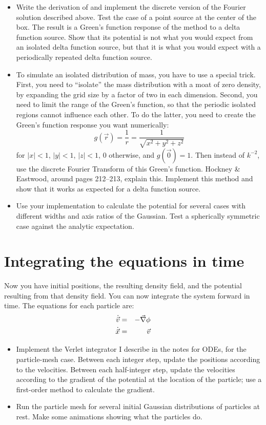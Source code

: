 \documentclass[11pt, preprint]{aastex}
\begin{document}
\begin{itemize}
\item Write the derivation of and implement the discrete version of
  the Fourier solution described above. Test the case of a point
  source at the center of the box. The result is a Green's function
  response of the method to a delta function source. Show that its
  potential is not what you would expect from an isolated delta
  function source, but that it is what you would expect with a
  periodically repeated delta function source.
\item To simulate an isolated distribution of mass, you have to use a
  special trick. First, you need to ``isolate'' the mass distribution
  with a moat of zero density, by expanding the grid size by a factor
  of two in each dimension. Second, you need to limit the range of the
  Green's function, so that the periodic isolated regions cannot
  influence each other. To do the latter, you need to create the
  Green's function response you want numerically:
  \begin{equation}
    g(\vec{r}) = \frac{1}{r} = \frac{1}{\sqrt{x^2 +y^2 + z^2}}
  \end{equation}
  for $|x|<1$, $|y|<1$, $|z|<1$, 0 otherwise, and $g(\vec{0}) =
  1$. Then instead of $k^{-2}$, use the discrete Fourier Transform of
  this Green's function.  Hockney \& Eastwood, around pages 212--213,
  explain this. Implement this method and show that it works as
  expected for a delta function source.
\item Use your implementation to calculate the potential for several
  cases with different widths and axis ratios of the Gaussian. Test
  a spherically symmetric case against the analytic expectation.
\end{itemize}

\section{Integrating the equations in time}

Now you have initial positions, the resulting density field, and the
potential resulting from that density field. You can now integrate the
system forward in time. The equations for each particle are:
\begin{eqnarray}
\dot{\vec{v}} &=& -\vec{\nabla}\phi \cr
\dot{\vec{x}} &=& \vec{v} 
\end{eqnarray}

\begin{itemize}
\item Implement the Verlet integrator I describe in the notes for
  ODEs, for the particle-mesh case. Between each integer step,
  update the positions according to the velocities. Between each
  half-integer step, update the velocities according to the gradient
  of the potential at the location of the particle; use a first-order
  method to calculate the gradient. 
\item Run the particle mesh for several initial Gaussian distributions
  of particles at rest. Make some animations showing what the
  particles do. 
\end{itemize}
\end{document}
